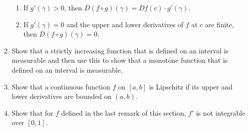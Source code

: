 \begin{enumerate}
\begin{enumerate}[label=(\roman*),align=left]
        \item If $g'(\gamma)>0$, then $\overline{D}(f\circ g)(\gamma)=\overline{D}f(c)\cdot g'(\gamma)$.
        \item If $g'(\gamma)=0$ and the upper and lower derivatives of $f$ at $c$ are finite, then $\overline{D}(f\circ g)(\gamma)=0$.
    \end{enumerate}
    \item Show that a strictly increasing function that is defined on an interval is measurable and then use this to show that a monotone function that is defined on an interval is measurable.
    \item Show that a continuous function $f$ on $[a,b]$ is Lipschitz if its upper and lower derivatives are bounded on $(a,b)$.
    \item Show that for $f$ defined in the last remark of this section, $f'$ is not integrable over $[0,1]$.
\end{enumerate}

